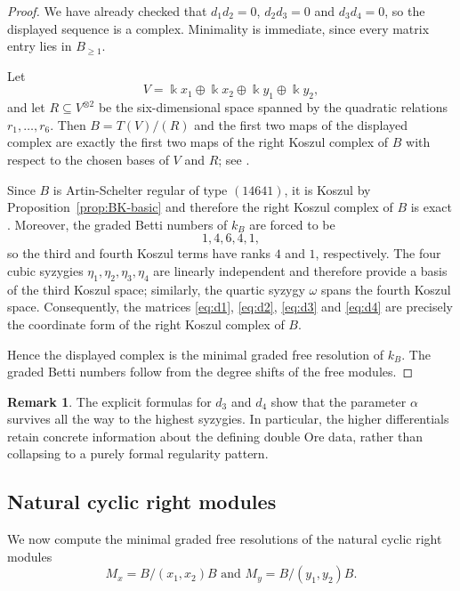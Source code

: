 \documentclass[reqno]{amsart}
\numberwithin{equation}{section}
\theoremstyle{definition}
\newtheorem{remark}[theorem]{Remark}
\begin{document}
\begin{proof}
We have already checked that \(d_1d_2=0\), \(d_2d_3=0\) and \(d_3d_4=0\), so the displayed sequence is a complex. Minimality is immediate, since every matrix entry lies in \(B_{\ge 1}\).

Let
\[
V=\Bbbk x_1\oplus \Bbbk x_2\oplus \Bbbk y_1\oplus \Bbbk y_2,
\]
and let \(R\subseteq V^{\otimes 2}\) be the six-dimensional space spanned by the quadratic relations \(r_1,\dots,r_6\). Then \(B=T(V)/(R)\) and the first two maps of the displayed complex are exactly the first two maps of the right Koszul complex of \(B\) with respect to the chosen bases of \(V\) and \(R\); see \cite[Chs.~2 and~3]{PP05}.

Since \(B\) is Artin-Schelter regular of type \((14641)\), it is Koszul by Proposition~\ref{prop:BK-basic} and therefore the right Koszul complex of \(B\) is exact \cite{Pri70,PP05}. Moreover, the graded Betti numbers of \(k_B\) are forced to be
\[
1,4,6,4,1,
\]
so the third and fourth Koszul terms have ranks \(4\) and \(1\), respectively. The four cubic syzygies \(\eta_1,\eta_2,\eta_3,\eta_4\) are linearly independent and therefore provide a basis of the third Koszul space; similarly, the quartic syzygy \(\omega\) spans the fourth Koszul space. Consequently, the matrices \eqref{eq:d1}, \eqref{eq:d2}, \eqref{eq:d3} and \eqref{eq:d4} are precisely the coordinate form of the right Koszul complex of \(B\).

Hence the displayed complex is the minimal graded free resolution of \(k_B\). The graded Betti numbers follow from the degree shifts of the free modules.
\end{proof}

\begin{remark}
The explicit formulas for \(d_3\) and \(d_4\) show that the parameter \(\alpha\) survives all the way to the highest syzygies. In particular, the higher differentials retain concrete information about the defining double Ore data, rather than collapsing to a purely formal regularity pattern.
\end{remark}

\subsection{Natural cyclic right modules}

We now compute the minimal graded free resolutions of the natural cyclic right modules
\[
M_x=B/(x_1,x_2)B
\text{ and }
M_y=B/(y_1,y_2)B.
\]
\end{document}
